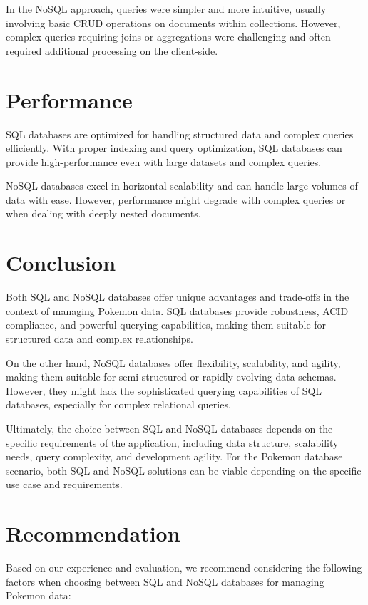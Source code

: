 \documentclass{article}
\begin{document}
In the NoSQL approach, queries were simpler and more intuitive, usually involving basic CRUD operations on documents within collections. However, complex queries requiring joins or aggregations were challenging and often required additional processing on the client-side.

\section{Performance}

SQL databases are optimized for handling structured data and complex queries efficiently. With proper indexing and query optimization, SQL databases can provide high-performance even with large datasets and complex queries.

NoSQL databases excel in horizontal scalability and can handle large volumes of data with ease. However, performance might degrade with complex queries or when dealing with deeply nested documents.

\section{Conclusion}

Both SQL and NoSQL databases offer unique advantages and trade-offs in the context of managing Pokemon data. SQL databases provide robustness, ACID compliance, and powerful querying capabilities, making them suitable for structured data and complex relationships.

On the other hand, NoSQL databases offer flexibility, scalability, and agility, making them suitable for semi-structured or rapidly evolving data schemas. However, they might lack the sophisticated querying capabilities of SQL databases, especially for complex relational queries.

Ultimately, the choice between SQL and NoSQL databases depends on the specific requirements of the application, including data structure, scalability needs, query complexity, and development agility. For the Pokemon database scenario, both SQL and NoSQL solutions can be viable depending on the specific use case and requirements.

\section{Recommendation}

Based on our experience and evaluation, we recommend considering the following factors when choosing between SQL and NoSQL databases for managing Pokemon data:
\end{document}

